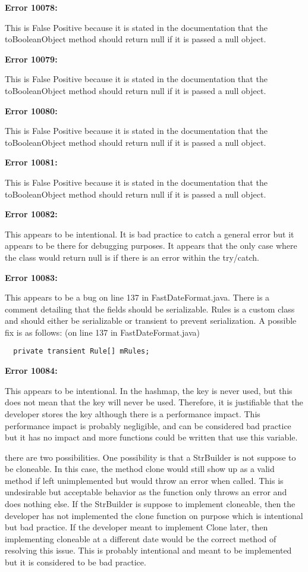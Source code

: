 \documentclass{article}
\begin{document}
\begin{enumerate}[(a)]
  \textbf{Error 10078:}

  This is False Positive because it is stated in the documentation that the toBooleanObject method should return null if it is passed a null object.

  \textbf{Error 10079:}

  This is False Positive because it is stated in the documentation that the toBooleanObject method should return null if it is passed a null object.

  \textbf{Error 10080:}

  This is False Positive because it is stated in the documentation that the toBooleanObject method should return null if it is passed a null object.

  \textbf{Error 10081:}

  This is False Positive because it is stated in the documentation that the toBooleanObject method should return null if it is passed a null object.

  \textbf{Error 10082:}

  This appears to be intentional. It is bad practice to catch a general error but it appears to be there for debugging purposes. It appears that the only case where the class would return null is if there is an error within the try/catch.

  \textbf{Error 10083:}

  This appears to be a bug on line 137 in FastDateFormat.java. There is a comment detailing that the fields should be serializable. Rules is a custom class and should either be serializable or transient to prevent serialization. A possible fix is as follows: (on line 137 in FastDateFormat.java)

  \begin{lstlisting}
  private transient Rule[] mRules;
  \end{lstlisting}

  \textbf{Error 10084:}

  This appears to be intentional. In the hashmap, the key is never used, but this does not mean that the key will never be used. Therefore, it is justifiable that the developer stores the key although there is a performance impact. This performance impact is probably negligible, and can be considered bad practice but it has no impact and more functions could be written that use this variable.

  there are two possibilities. One possibility is that a StrBuilder is not suppose to be cloneable. In this case, the method clone would still show up as a valid method if left unimplemented but would throw an error when called. This is undesirable but acceptable behavior as the function only throws an error and does nothing else. If the StrBuilder is suppose to implement cloneable, then the developer has not implemented the clone function on purpose which is intentional but bad practice. If the developer meant to implement Clone later, then implementing cloneable at a different date would be the correct method of resolving this issue. This is probably intentional and meant to be implemented but it is considered to be bad practice.


\end{enumerate}
\end{document}
